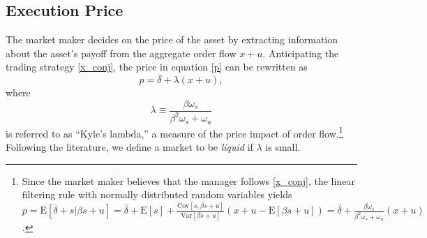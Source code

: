 \subsection{Execution Price} \label{ss:price}
The market maker decides on the price of the asset by extracting information about the asset's payoff from the aggregate order flow $x+u$. Anticipating the trading strategy \eqref{x_conj}, the price in equation \eqref{p} can be rewritten as
\begin{equation}
p=\bar{\delta}+\lambda(x+u),\label{eq:p}
\end{equation}
where
\begin{equation}
\lambda\equiv \frac{\beta \omega_{s}}{\beta^{2} \omega_{s}+\omega_{u}}\label{lambda}
\end{equation}
is referred to as ``Kyle's lambda,'' a measure of the price impact of order flow.\footnote{Since the market maker believes that the manager follows \eqref{x_conj}, the linear filtering rule with normally distributed random variables yields $p=\mathrm{E}[\bar{\delta} + s|\beta s + u] = \bar{\delta}+\mathrm{E}[s]+\frac{\mathrm{Cov}[s,\beta s+u]}{\mathrm{Var}[\beta s+u]}(x+u-\mathrm{E}[\beta s+u])=\bar{\delta}+\frac{\beta \omega_{s}}{\beta^{2} \omega_{s}+\omega_{u}}(x+u)$.} Following the literature, we define a market to be {\it liquid} if $\lambda$ is small.
